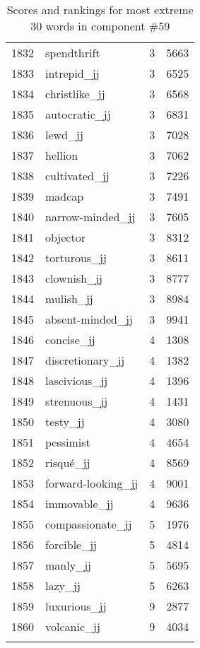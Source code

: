 \begin{longtable}[!htbp]{| rlr@{.}l |}
    1832 & spendthrift & 3 & 5663 \\
    1833 & intrepid\_jj & 3 & 6525 \\
    1834 & christlike\_jj & 3 & 6568 \\
    1835 & autocratic\_jj & 3 & 6831 \\
    1836 & lewd\_jj & 3 & 7028 \\
    1837 & hellion & 3 & 7062 \\
    1838 & cultivated\_jj & 3 & 7226 \\
    1839 & madcap & 3 & 7491 \\
    1840 & narrow-minded\_jj & 3 & 7605 \\
    1841 & objector & 3 & 8312 \\
    1842 & torturous\_jj & 3 & 8611 \\
    1843 & clownish\_jj & 3 & 8777 \\
    1844 & mulish\_jj & 3 & 8984 \\
    1845 & absent-minded\_jj & 3 & 9941 \\
    1846 & concise\_jj & 4 & 1308 \\
    1847 & discretionary\_jj & 4 & 1382 \\
    1848 & lascivious\_jj & 4 & 1396 \\
    1849 & strenuous\_jj & 4 & 1431 \\
    1850 & testy\_jj & 4 & 3080 \\
    1851 & pessimist & 4 & 4654 \\
    1852 & risqué\_jj & 4 & 8569 \\
    1853 & forward-looking\_jj & 4 & 9001 \\
    1854 & immovable\_jj & 4 & 9636 \\
    1855 & compassionate\_jj & 5 & 1976 \\
    1856 & forcible\_jj & 5 & 4814 \\
    1857 & manly\_jj & 5 & 5695 \\
    1858 & lazy\_jj & 5 & 6263 \\
    1859 & luxurious\_jj & 9 & 2877 \\
    1860 & volcanic\_jj & 9 & 4034 \\
    \hline
    \caption{Scores and rankings for most extreme 30 words in component \#59} \\
\end{longtable}
